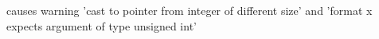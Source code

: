 
\begin{DoxyRefList}
\item[\label{todo__todo000001}%
\hypertarget{todo__todo000001}{}%
Global \hyperlink{tracked__memory_8h_a1ed5a096e4418b4468d1f6eb94fe953a}{output\-\_\-memory\-\_\-info} (struct \hyperlink{structmem__context}{mem\-\_\-context} $\ast$const context)]causes warning 'cast to pointer from integer of different size' and 'format x expects argument of type unsigned int' 
\end{DoxyRefList}